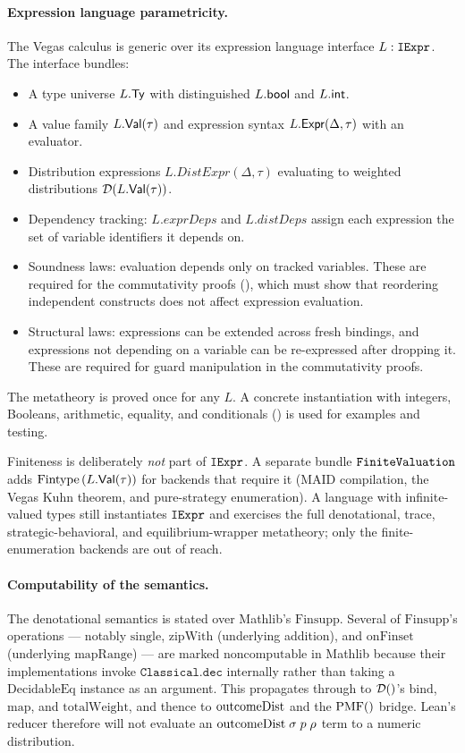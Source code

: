 \documentclass[11pt]{article}
\begin{document}
\paragraph{Expression language parametricity.}
The Vegas calculus is generic over its expression language interface
$L : \texttt{IExpr}$. The interface bundles:
\begin{itemize}[nosep]
\item A type universe $L.\mathsf{Ty}$ with distinguished $L.\mathsf{bool}$ and $L.\mathsf{int}$.
\item A value family $L.\mathsf{Val}(\tau)$ and expression syntax
      $L.\mathsf{Expr}(\Delta, \tau)$ with an evaluator.
\item Distribution expressions $L.\mathit{DistExpr}(\Delta, \tau)$ evaluating
      to weighted distributions $\mathcal{D}(L.\mathsf{Val}(\tau))$.
\item Dependency tracking: $L.\mathit{exprDeps}$ and $L.\mathit{distDeps}$
      assign each expression the set of variable identifiers it depends on.
\item Soundness laws: evaluation depends only on tracked variables. These are
      required for the commutativity proofs (), which must show
      that reordering independent constructs does not affect expression
      evaluation.
\item Structural laws: expressions can be extended across fresh bindings, and
      expressions not depending on a variable can be re-expressed after
      dropping it. These are required for guard manipulation in the
      commutativity proofs.
\end{itemize}
The metatheory is proved once for any $L$. A concrete instantiation with
integers, Booleans, arithmetic, equality, and conditionals
() is used for examples and testing.

Finiteness is deliberately \emph{not} part of $\texttt{IExpr}$. A separate
bundle $\texttt{FiniteValuation}$ adds $\mathrm{Fintype}\,(L.\mathsf{Val}(\tau))$
for backends that require it (MAID compilation, the Vegas Kuhn theorem, and
pure-strategy enumeration). A language with infinite-valued types still
instantiates $\texttt{IExpr}$ and exercises the full denotational, trace,
strategic-behavioral, and equilibrium-wrapper metatheory; only the
finite-enumeration backends are out of reach.

\paragraph{Computability of the semantics.}
The denotational semantics is stated over Mathlib's $\mathrm{Finsupp}$. Several
of $\mathrm{Finsupp}$'s operations --- notably $\mathrm{single}$, $\mathrm{zipWith}$
(underlying addition), and $\mathrm{onFinset}$ (underlying
$\mathrm{mapRange}$) --- are marked $\mathrm{noncomputable}$ in Mathlib
because their implementations invoke $\mathtt{Classical.dec}$ internally
rather than taking a $\mathrm{DecidableEq}$ instance as an argument. This
propagates through to $\mathcal{D}()$'s $\mathrm{bind}$, $\mathrm{map}$, and
$\mathrm{totalWeight}$, and thence to $\mathrm{outcomeDist}$ and the $\mathrm{PMF}()$
bridge. Lean's reducer therefore will not evaluate an
$\mathrm{outcomeDist}\;\sigma\;p\;\rho$ term to a numeric distribution.
\end{document}
